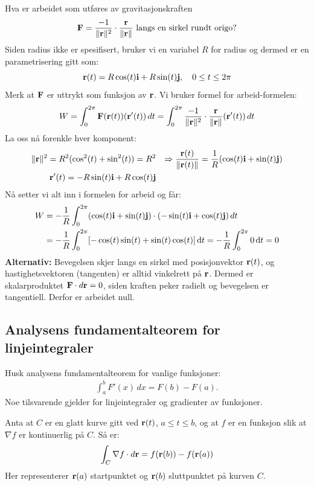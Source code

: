\begin{eks}{}
Hva er arbeidet som utføres av gravitasjonskraften
\[
\mathbf{F} = \frac{-1}{\lVert\mathbf{r}\rVert^2} \cdot \frac{\mathbf{r}}{\lVert \mathbf{r}\rVert} \text{  langs en sirkel rundt origo?}
\]
Siden radius ikke er spesifisert, bruker vi en variabel $R$ for radius og dermed er en parametrisering gitt som:
\[
\mathbf{r}(t) = R \cos(t) \mathbf{i} + R \sin(t) \mathbf{j}, \quad 0\leq t\leq 2\pi
\]
Merk at $\mathbf{F}$ er uttrykt som funksjon av $\mathbf{r}$. Vi bruker formel for arbeid-formelen:
\[
W = \int_0^{2\pi} \mathbf{F}(\mathbf{r}(t))(\mathbf{r}'(t))\, dt= \int_0^{2\pi}\frac{-1}{\lVert\mathbf{r}\rVert^2} \cdot \frac{\mathbf{r}}{\lVert \mathbf{r}\rVert}(\mathbf{r}'(t))\,dt
\]
La oss nå forenkle hver komponent:
\begin{align*}
\lVert\mathbf{r}\rVert^2 = R^2 (\cos^2(t) + \sin^2(t)) = R^2 
& &\Rightarrow \frac{\mathbf{r}(t)}{\lVert \mathbf{r}(t)\rVert} = \frac{1}{R}(\cos(t)\mathbf{i}+\sin(t)\mathbf{j})\\
\mathbf{r}'(t)=-R\sin(t)\mathbf{i}+R\cos(t)\mathbf{j}
\end{align*}
Nå setter vi alt inn i formelen for arbeid og får:
\begin{align*}
W &= -\frac{1}{R} \int_0^{2\pi} (\cos(t) \mathbf{i} + \sin(t) \mathbf{j}) \cdot (-\sin(t) \mathbf{i} + \cos(t) \mathbf{j})\, d t\\
 &= -\frac{1}{R} \int_0^{2\pi} [- \cos(t) \sin(t) +  \sin(t) \cos(t)] \mathop{}\!\mathrm{d}{t}
= -\frac{1}{R} \int_0^{2\pi} 0 \mathop{}\!\mathrm{d}{t} = 0
\end{align*}
\textbf{Alternativ:} Bevegelsen skjer langs en sirkel med posisjonvektor $\mathbf{r}(t)$, og hastighetsvektoren (tangenten) er alltid vinkelrett på $\mathbf{r}$. Dermed er skalarproduktet $\mathbf{F} \cdot d \mathbf{r} = 0$, siden kraften peker radielt og bevegelsen er tangentiell. Derfor er arbeidet null.
\end{eks}

%
%
%
\subsection*{Analysens fundamentalteorem for linjeintegraler}

Husk analysens fundamentalteorem for vanlige funksjoner:
\begin{align}\label{ana_fun_thm}
\int_a^b F'(x)\, dx = F(b) - F(a).
\end{align}
Noe tilsvarende gjelder for linjeintegraler og gradienter av funksjoner.

\begin{thm}\label{funthm_linjeint}
Anta at \( C \) er en glatt kurve gitt ved \( \mathbf{r}(t) \), \( a \leq t \leq b \), og at \( f \) er en funksjon slik at \( \nabla f \) er kontinuerlig på \( C \). Så er:
\[
\int_C \nabla f \cdot d\mathbf{r} = f(\mathbf{r}(b)) - f(\mathbf{r}(a))
\]
Her representerer \( \mathbf{r}(a) \) startpunktet og \( \mathbf{r}(b) \) sluttpunktet på kurven \( C \).
\end{thm}

